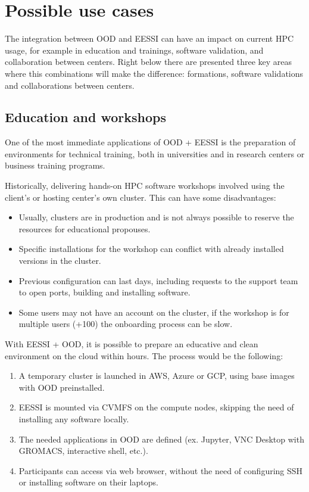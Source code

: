 \documentclass[11pt,a4paper]{article}
\begin{document}
\section{Possible use cases}

The integration between OOD and EESSI can have an impact on current HPC usage, for example in education and trainings, software validation, and collaboration between centers. Right below there are presented three key areas where this combinations will make the difference: formations, software validations and collaborations between centers.

\subsection{Education and workshops}

One of the most immediate applications of OOD + EESSI is the preparation of environments for technical training, both in universities and in research centers or business training programs.

Historically, delivering hands-on HPC software workshops involved using the client's or hosting center's own cluster. This can have some disadvantages:

\begin{itemize}
    \item Usually, clusters are in production and is not always possible to reserve the resources for educational propouses.
    \item Specific installations for the workshop can conflict with already installed versions in the cluster.
    \item Previous configuration can last days, including requests to the support team to open ports, building and installing software.
    \item Some users may not have an account on the cluster, if the workshop is for multiple users (+100) the onboarding process can be slow.
\end{itemize}

With EESSI + OOD, it is possible to prepare an educative and clean environment on the cloud within hours. The process would be the following:

\begin{enumerate}
    \item A temporary cluster is launched in AWS, Azure or GCP, using base images with OOD preinstalled.
    \item EESSI is mounted via CVMFS on the compute nodes, skipping the need of installing any software locally.
    \item The needed applications in OOD are defined (ex. Jupyter, VNC Desktop with GROMACS, interactive shell, etc.).
    \item Participants can access via web browser, without the need of configuring SSH or installing software on their laptops.
\end{enumerate}
\end{document}
